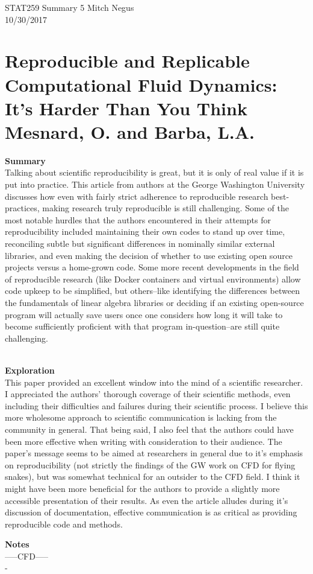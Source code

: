 \documentclass{report}
\newcommand{\tab}{\-\hspace{1cm}}
\begin{document}
\thispagestyle{empty}
\sffamily

\large {STAT259 Summary {5} \hfill Mitch Negus\\
		\hspace*{\fill} 10/30/2017\\ }
\section*{\textsf{Reproducible and Replicable Computational Fluid Dynamics: It's Harder Than You Think \\ \normalsize Mesnard, O. and Barba, L.A.}}

\textbf{Summary}\\
\tab Talking about scientific reproducibility is great, but it is only of real value if it is put into practice. This article from authors at the George Washington University discusses how even with fairly strict adherence to reproducible research best-practices, making research truly reproducible is still challenging. Some of the most notable hurdles that the authors encountered in their attempts for reproducibility included maintaining their own codes to stand up over time, reconciling subtle but significant differences in nominally similar external libraries, and even making the decision of whether to use existing open source projects versus a home-grown code. Some more recent developments in the field of reproducible research (like Docker containers and virtual environments) allow code upkeep to be simplified, but others--like identifying the differences between the fundamentals of linear algebra libraries or deciding if an existing open-source program will actually save users once one considers how long it will take to become sufficiently proficient with that program in-question--are still quite challenging.

\-\\
\textbf{Exploration}\\
\tab This paper provided an excellent window into the mind of a scientific researcher. I appreciated the authors' thorough coverage of their scientific methods, even including their difficulties and failures during their scientific process. I believe this more wholesome approach to scientific communication is lacking from the community in general. That being said, I also feel that the authors could have been more effective when writing with consideration to their audience. The paper's message seems to be aimed at researchers in general due to it's emphasis on reproducibility (not strictly the findings of the GW work on CFD for flying snakes), but was somewhat technical for an outsider to the CFD field. I think it might have been more beneficial for the authors to provide a slightly more accessible presentation of their results. As even the article alludes during it's discussion of documentation, effective communication is as critical as providing reproducible code and methods.  \\


\newpage

\textbf{Notes}\\

-----CFD-----\\
-
\end{document}

